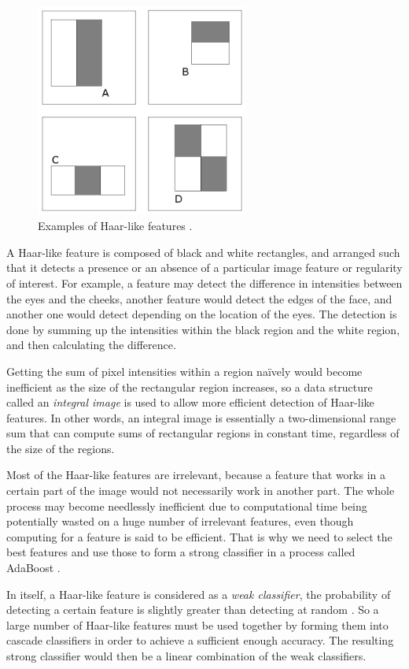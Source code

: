 \begin{figure}[!h]
    \centering
    \includegraphics[width=7cm]{figures/haarfeatures2.png}
    \caption{Examples of Haar-like features \cite{viola_robust_2004}.}
\end{figure}

A Haar-like feature is composed of black and white rectangles, and arranged such that it detects a presence or an absence of a particular image feature or regularity of interest. For example, a feature may detect the difference in intensities between the eyes and the cheeks, another feature would detect the edges of the face, and another one would detect depending on the location of the eyes. The detection is done by summing up the intensities within the black region and the white region, and then calculating the difference.

Getting the sum of pixel intensities within a region na\"{i}vely would become inefficient as the size of the rectangular region increases, so a data structure called an \textit{integral image} is used to allow more efficient detection of Haar-like features. In other words, an integral image is essentially a two-dimensional range sum that can compute sums of rectangular regions in constant time, regardless of the size of the regions.

Most of the Haar-like features are irrelevant, because a feature that works in a certain part of the image would not necessarily work in another part. The whole process may become needlessly inefficient due to computational time being potentially wasted on a huge number of irrelevant features, even though computing for a feature is said to be efficient. That is why we need to select the best features and use those to form a strong classifier in a process called AdaBoost \cite{viola_robust_2004}.

In itself, a Haar-like feature is considered as a \textit{weak classifier}, the probability of detecting a certain feature is slightly greater than detecting at random \cite{viola_robust_2004}. So a large number of Haar-like features must be used together by forming them into cascade classifiers in order to achieve a sufficient enough accuracy. The resulting strong classifier would then be a linear combination of the weak classifiers.

